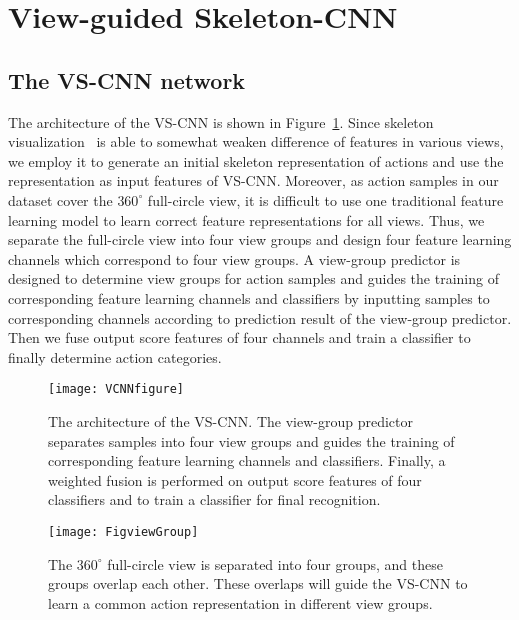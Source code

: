 \documentclass[journal]{IEEEtran}
\begin{document}
\section{View-guided Skeleton-CNN}
\label{sec:VSK-CNN}

\subsection{The VS-CNN network}
The architecture of the VS-CNN is shown in Figure~\ref{fig:VSCNN}. Since skeleton visualization~\cite{EnhancedSK2017} is able to somewhat weaken difference of features in various views, we employ it to generate an initial skeleton representation of actions and use the representation as input features of VS-CNN. Moreover, as action samples in our dataset cover the $360^\circ$ full-circle view, it is difficult to use one traditional feature learning model to learn correct feature representations for all views. Thus, we separate the full-circle view into four view groups and design four feature learning channels which correspond to four view groups. A view-group predictor is designed to determine view groups for action samples and guides the training of corresponding feature learning channels and classifiers by inputting samples to corresponding channels according to prediction result of the view-group predictor. Then we fuse output score features of four channels and train a classifier to finally determine action categories.

\begin{figure}[t]
\begin{center}
\texttt{[image: VCNNfigure]}
\end{center}
   \caption{The architecture of the VS-CNN. The view-group predictor separates samples into four view groups and guides the training of corresponding feature learning channels and classifiers. Finally, a weighted fusion is performed on output score features of four classifiers and to train a classifier for final recognition. }
\label{fig:VSCNN}
\end{figure}

\begin{figure}[t]
\begin{center}
\texttt{[image: FigviewGroup]}
\end{center}
   \caption{The $360^\circ$ full-circle view is separated into four groups, and these groups overlap each other. These overlaps will guide the VS-CNN to learn a common action representation in different view groups.}
\label{fig:viewGroup}
\end{figure}
\end{document}
